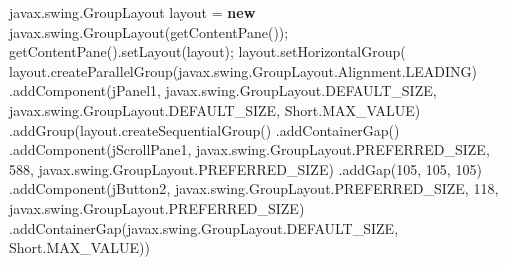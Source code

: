 \documentclass[
  10pt,
]{article}
\newenvironment{Shaded}{}{}
\newcommand{\BuiltInTok}[1]{\textcolor[rgb]{0.00,0.50,0.00}{#1}}
\newcommand{\DecValTok}[1]{\textcolor[rgb]{0.25,0.63,0.44}{#1}}
\newcommand{\FunctionTok}[1]{\textcolor[rgb]{0.02,0.16,0.49}{#1}}
\newcommand{\KeywordTok}[1]{\textcolor[rgb]{0.00,0.44,0.13}{\textbf{#1}}}
\newcommand{\NormalTok}[1]{#1}
\newcommand{\OperatorTok}[1]{\textcolor[rgb]{0.40,0.40,0.40}{#1}}
\begin{document}
\begin{Shaded}
\begin{Highlighting}[numbers=left,,]
\NormalTok{        javax}\OperatorTok{.}\FunctionTok{swing}\OperatorTok{.}\FunctionTok{GroupLayout}\NormalTok{ layout }\OperatorTok{=} \KeywordTok{new}\NormalTok{ javax}\OperatorTok{.}\FunctionTok{swing}\OperatorTok{.}\FunctionTok{GroupLayout}\OperatorTok{(}\FunctionTok{getContentPane}\OperatorTok{());}
        \FunctionTok{getContentPane}\OperatorTok{().}\FunctionTok{setLayout}\OperatorTok{(}\NormalTok{layout}\OperatorTok{);}
\NormalTok{        layout}\OperatorTok{.}\FunctionTok{setHorizontalGroup}\OperatorTok{(}
\NormalTok{            layout}\OperatorTok{.}\FunctionTok{createParallelGroup}\OperatorTok{(}\NormalTok{javax}\OperatorTok{.}\FunctionTok{swing}\OperatorTok{.}\FunctionTok{GroupLayout}\OperatorTok{.}\FunctionTok{Alignment}\OperatorTok{.}\FunctionTok{LEADING}\OperatorTok{)}
            \OperatorTok{.}\FunctionTok{addComponent}\OperatorTok{(}\NormalTok{jPanel1}\OperatorTok{,}\NormalTok{ javax}\OperatorTok{.}\FunctionTok{swing}\OperatorTok{.}\FunctionTok{GroupLayout}\OperatorTok{.}\FunctionTok{DEFAULT\_SIZE}\OperatorTok{,}\NormalTok{ javax}\OperatorTok{.}\FunctionTok{swing}\OperatorTok{.}\FunctionTok{GroupLayout}\OperatorTok{.}\FunctionTok{DEFAULT\_SIZE}\OperatorTok{,} \BuiltInTok{Short}\OperatorTok{.}\FunctionTok{MAX\_VALUE}\OperatorTok{)}
            \OperatorTok{.}\FunctionTok{addGroup}\OperatorTok{(}\NormalTok{layout}\OperatorTok{.}\FunctionTok{createSequentialGroup}\OperatorTok{()}
                \OperatorTok{.}\FunctionTok{addContainerGap}\OperatorTok{()}
                \OperatorTok{.}\FunctionTok{addComponent}\OperatorTok{(}\NormalTok{jScrollPane1}\OperatorTok{,}\NormalTok{ javax}\OperatorTok{.}\FunctionTok{swing}\OperatorTok{.}\FunctionTok{GroupLayout}\OperatorTok{.}\FunctionTok{PREFERRED\_SIZE}\OperatorTok{,} \DecValTok{588}\OperatorTok{,}\NormalTok{ javax}\OperatorTok{.}\FunctionTok{swing}\OperatorTok{.}\FunctionTok{GroupLayout}\OperatorTok{.}\FunctionTok{PREFERRED\_SIZE}\OperatorTok{)}
                \OperatorTok{.}\FunctionTok{addGap}\OperatorTok{(}\DecValTok{105}\OperatorTok{,} \DecValTok{105}\OperatorTok{,} \DecValTok{105}\OperatorTok{)}
                \OperatorTok{.}\FunctionTok{addComponent}\OperatorTok{(}\NormalTok{jButton2}\OperatorTok{,}\NormalTok{ javax}\OperatorTok{.}\FunctionTok{swing}\OperatorTok{.}\FunctionTok{GroupLayout}\OperatorTok{.}\FunctionTok{PREFERRED\_SIZE}\OperatorTok{,} \DecValTok{118}\OperatorTok{,}\NormalTok{ javax}\OperatorTok{.}\FunctionTok{swing}\OperatorTok{.}\FunctionTok{GroupLayout}\OperatorTok{.}\FunctionTok{PREFERRED\_SIZE}\OperatorTok{)}
                \OperatorTok{.}\FunctionTok{addContainerGap}\OperatorTok{(}\NormalTok{javax}\OperatorTok{.}\FunctionTok{swing}\OperatorTok{.}\FunctionTok{GroupLayout}\OperatorTok{.}\FunctionTok{DEFAULT\_SIZE}\OperatorTok{,} \BuiltInTok{Short}\OperatorTok{.}\FunctionTok{MAX\_VALUE}\OperatorTok{))}

\end{Highlighting}
\end{Shaded}
\end{document}
